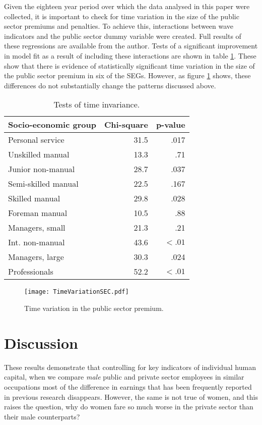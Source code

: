 \documentclass[a4paper,11pt,titlepage]{article}
\begin{document}
Given the eighteen year period over which the data analysed in this paper were collected, it is important to check for time variation in the size of the public sector premiums and penalties.  To achieve this, interactions between wave indicators and the public sector dummy variable were created.  Full results of these regressions are available from the author.  Tests of a significant improvement in model fit as a result of including these interactions are shown in table \ref{tab:time}.  These show that there is evidence of statistically significant time variation in the size of the public sector premium in six of the SEGs.  However, as figure \ref{fig:time} shows, these differences do not substantially change the patterns discussed above.

\begin{table}[ht]
    \caption{Tests of time invariance. \label{tab:time}}
    \begin{center}
    \begin{tabular}{lrr}
    \toprule
    Socio-economic group & Chi-square & p-value \\
    \midrule
    Personal service & 31.5 & .017 \\
    Unskilled manual & 13.3 & .71 \\
    Junior non-manual & 28.7 & .037 \\
    Semi-skilled manual & 22.5 & .167 \\
    Skilled manual & 29.8 & .028 \\
    Foreman manual & 10.5 & .88 \\
    Managers, small & 21.3 & .21 \\
    Int. non-manual & 43.6 & $ < .01 $\\
    Managers, large&30.3 & .024 \\
    Professionals & 52.2 & $< .01$ \\
    \bottomrule
    \end{tabular}
    \end{center}
\end{table}

\begin{figure}[ht]
    \texttt{[image: TimeVariationSEC.pdf]}
    \caption{Time variation in the public sector premium. \label{fig:time}}
\end{figure}

\section{Discussion}
These results demonstrate that controlling for key indicators of individual human capital, when we compare \emph{male} public and private sector employees in similar occupations most of the difference in earnings that has been frequently reported in previous research disappears.  However, the same is not true of women, and this raises the question, why do women fare so much worse in the private sector than their male counterparts?
\end{document}
